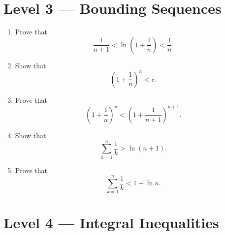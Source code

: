 \documentclass{essay}
\begin{document}
\section*{Level 3 --- Bounding Sequences}

\begin{enumerate}[resume]

    \item Prove that
    \[
        \frac{1}{n+1}
        <
        \ln\!\left(1+\frac{1}{n}\right)
        <
        \frac{1}{n}.
    \]

    \item Show that
    \[
        \left(1+\frac{1}{n}\right)^n < e.
    \]

    \item Prove that
    \[
        \left(1+\frac{1}{n}\right)^n
        <
        \left(1+\frac{1}{n+1}\right)^{n+1}.
    \]

    \item Show that
    \[
        \sum_{k=1}^{n}\frac{1}{k}
        >
        \ln(n+1).
    \]

    \item Prove that
    \[
        \sum_{k=1}^{n}\frac{1}{k}
        <
        1+\ln n.
    \]
\end{enumerate}

\section*{Level 4 --- Integral Inequalities}
\end{document}
